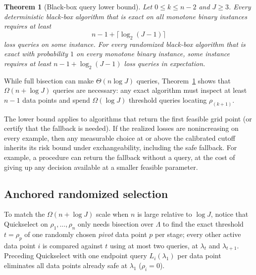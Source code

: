 \documentclass[a4paper,10pt]{article}
\theoremstyle{plain}
\newtheorem{theorem}{Theorem}[section]
\theoremstyle{remark}
\begin{document}
\begin{theorem}[Black-box query lower bound]\label{thm:lower}
Let $0\le k\le n-2$ and $J\ge3$. Every deterministic black-box algorithm that is exact on all monotone binary instances requires at least
\begin{equation}\label{eq:lower}
 n-1+\lceil\log_2(J-1)\rceil
\end{equation}
loss queries on some instance. For every randomized black-box algorithm that is exact with probability $1$ on every monotone binary instance, some instance requires at least $n-1+\log_2(J-1)$ loss queries in expectation.
\end{theorem}

While full bisection can make $\Theta(n\log J)$ queries, Theorem~\ref{thm:lower} shows that $\Omega(n+\log J)$ queries are necessary: any exact algorithm must inspect at least $n-1$ data points and spend $\Omega(\log J)$ threshold queries locating $\rho_{(k+1)}$.

The lower bound applies to algorithms that return the first feasible grid point (or certify that the fallback is needed). If the realized losses are nonincreasing on every example, then any measurable choice at or above the calibrated cutoff inherits its risk bound under exchangeability, including the safe fallback. For example, a procedure can return the fallback without a query, at the cost of giving up any decision available at a smaller feasible parameter.

\subsection{Anchored randomized selection}\label{sec:selection}

To match the $\Omega(n+\log J)$ scale when $n$ is large relative to $\log J$, notice that Quickselect on $\rho_1,\ldots,\rho_n$ only needs bisection over $\Lambda$ to find the exact threshold $t=\rho_p$ of one randomly chosen \emph{pivot} data point $p$ per stage; every other active data point $i$ is compared against $t$ using at most two queries, at $\lambda_t$ and $\lambda_{t+1}$. Preceding Quickselect with one endpoint query $L_i(\lambda_1)$ per data point eliminates all data points already safe at $\lambda_1$ ($\rho_i=0$).
\end{document}
